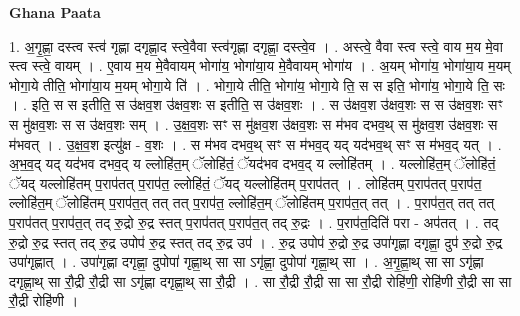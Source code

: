 \documentclass[17pt]{extarticle}
\begin{document}
\textbf{Ghana Paata } \newline

1. अ॒गृ॒ह्णा॒ दस्त्व स्त्व॑ गृह्णा दगृह्णा॒द स्त्वे॒वैवा स्त्व॑गृह्णा दगृह्णा॒ दस्त्वे॒व । . अस्त्वे॒ वैवा स्त्व स्त्वे॒ वाय म॒य मे॒वा स्त्व स्त्वे॒ वायम् । . ए॒वाय म॒य मे॒वैवायम् भोगा॑य॒ भोगा॑या॒य मे॒वैवायम् भोगा॑य । . अ॒यम् भोगा॑य॒ भोगा॑या॒य म॒यम् भोगा॒ये तीति॒ भोगा॑या॒य म॒यम् भोगा॒ये ति॑ । . भोगा॒ये तीति॒ भोगा॑य॒ भोगा॒ये ति॒ स स इति॒ भोगा॑य॒ भोगा॒ये ति॒ सः । . इति॒ स स इतीति॒ स उ॑क्षव॒श उ॑क्षव॒शः स इतीति॒ स उ॑क्षव॒शः । . स उ॑क्षव॒श उ॑क्षव॒शः स स उ॑क्षव॒शः सꣳ स मु॑क्षव॒शः स स उ॑क्षव॒शः सम् । . उ॒क्ष॒व॒शः सꣳ स मु॑क्षव॒श उ॑क्षव॒शः स म॑भव दभव॒थ् स मु॑क्षव॒श उ॑क्षव॒शः स म॑भवत् । . उ॒क्ष॒व॒श इत्यु॑क्ष - व॒शः । . स म॑भव दभव॒थ् सꣳ स म॑भव॒द् यद् यद॑भव॒थ् सꣳ स म॑भव॒द् यत् । . अ॒भ॒व॒द् यद् यद॑भव दभव॒द् य ल्लोहि॑त॒म् ॅलोहि॑तं॒ ॅयद॑भव दभव॒द् य ल्लोहि॑तम् । . यल्लोहि॑त॒म् ॅलोहि॑तं॒ ॅयद् यल्लोहि॑तम् प॒राप॑तत् प॒राप॑त॒ ल्लोहि॑तं॒ ॅयद् यल्लोहि॑तम् प॒राप॑तत् । . लोहि॑तम् प॒राप॑तत् प॒राप॑त॒ ल्लोहि॑त॒म् ॅलोहि॑तम् प॒राप॑त॒त् तत् तत् प॒राप॑त॒ ल्लोहि॑त॒म् ॅलोहि॑तम् प॒राप॑त॒त् तत् । . प॒राप॑त॒त् तत् तत् प॒राप॑तत् प॒राप॑त॒त् तद् रु॒द्रो रु॒द्र स्तत् प॒राप॑तत् प॒राप॑त॒त् तद् रु॒द्रः । . प॒राप॑त॒दिति॑ परा - अप॑तत् । . तद् रु॒द्रो रु॒द्र स्तत् तद् रु॒द्र उपोप॑ रु॒द्र स्तत् तद् रु॒द्र उप॑ । . रु॒द्र उपोप॑ रु॒द्रो रु॒द्र उपा॑गृह्णा दगृह्णा॒ दुप॑ रु॒द्रो रु॒द्र उपा॑गृह्णात् । . उपा॑गृह्णा दगृह्णा॒ दुपोपा॑ गृह्णा॒थ् सा सा ऽगृ॑ह्णा॒ दुपोपा॑ गृह्णा॒थ् सा । . अ॒गृ॒ह्णा॒थ् सा सा ऽगृ॑ह्णा दगृह्णा॒थ् सा रौ॒द्री रौ॒द्री सा ऽगृ॑ह्णा दगृह्णा॒थ् सा रौ॒द्री । . सा रौ॒द्री रौ॒द्री सा सा रौ॒द्री रोहि॑णी॒ रोहि॑णी रौ॒द्री सा सा रौ॒द्री रोहि॑णी । \newline
\end{document}
